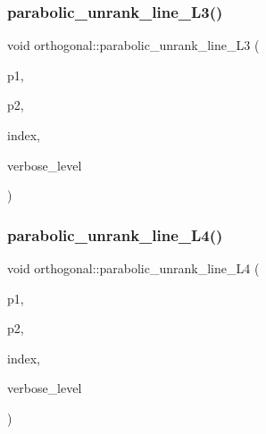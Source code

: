 \subsubsection{\texorpdfstring{parabolic\+\_\+unrank\+\_\+line\+\_\+\+L3()}{parabolic\_unrank\_line\_L3()}}
{\footnotesize\ttfamily void orthogonal\+::parabolic\+\_\+unrank\+\_\+line\+\_\+\+L3 (\begin{DoxyParamCaption}\item[{\mbox{\hyperlink{galois_8h_a09fddde158a3a20bd2dcadb609de11dc}{I\+NT}} \&}]{p1,  }\item[{\mbox{\hyperlink{galois_8h_a09fddde158a3a20bd2dcadb609de11dc}{I\+NT}} \&}]{p2,  }\item[{\mbox{\hyperlink{galois_8h_a09fddde158a3a20bd2dcadb609de11dc}{I\+NT}}}]{index,  }\item[{\mbox{\hyperlink{galois_8h_a09fddde158a3a20bd2dcadb609de11dc}{I\+NT}}}]{verbose\+\_\+level }\end{DoxyParamCaption})}

\mbox{\label{classorthogonal_a6a30b6c7f59498ad8c7f2bec7c78d2ff}} 
\subsubsection{\texorpdfstring{parabolic\+\_\+unrank\+\_\+line\+\_\+\+L4()}{parabolic\_unrank\_line\_L4()}}
{\footnotesize\ttfamily void orthogonal\+::parabolic\+\_\+unrank\+\_\+line\+\_\+\+L4 (\begin{DoxyParamCaption}\item[{\mbox{\hyperlink{galois_8h_a09fddde158a3a20bd2dcadb609de11dc}{I\+NT}} \&}]{p1,  }\item[{\mbox{\hyperlink{galois_8h_a09fddde158a3a20bd2dcadb609de11dc}{I\+NT}} \&}]{p2,  }\item[{\mbox{\hyperlink{galois_8h_a09fddde158a3a20bd2dcadb609de11dc}{I\+NT}}}]{index,  }\item[{\mbox{\hyperlink{galois_8h_a09fddde158a3a20bd2dcadb609de11dc}{I\+NT}}}]{verbose\+\_\+level }\end{DoxyParamCaption})}

\mbox{\label{classorthogonal_a77831b97ebbbc5d8103c5e7e0edfeb9b}} 

